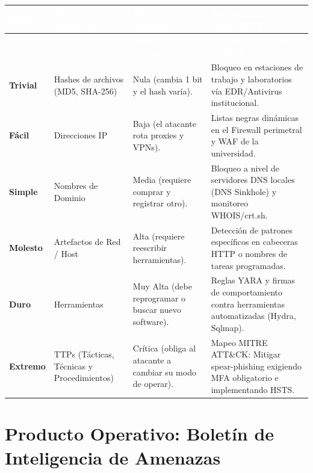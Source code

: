 \vspace{-0.5em}

\begingroup
\small
\begin{longtable}{>{\centering\arraybackslash}p{1.7cm} p{3.0cm} p{3.2cm} p{6.8cm}}
\toprule
\rowcolor{fg}
\textcolor{white}{Nivel} & \textcolor{white}{Tipo de Indicador} & \textcolor{white}{Dificultad Atacante} & \textcolor{white}{Aplicación Defensiva en la UNAP} \\
\midrule
\endfirsthead
\toprule
\rowcolor{fg}
\textcolor{white}{Nivel} & \textcolor{white}{Tipo de Indicador} & \textcolor{white}{Dificultad Atacante} & \textcolor{white}{Aplicación Defensiva en la UNAP} \\
\midrule
\endhead
\bottomrule
\endfoot
\textcolor{popHash!70!black}{\textbf{Trivial}} & Hashes de archivos (MD5, SHA-256) & Nula (cambia 1 bit y el hash varía). & Bloqueo en estaciones de trabajo y laboratorios vía EDR/Antivirus institucional. \\
\midrule
\textcolor{popIP!80!black}{\textbf{Fácil}} & Direcciones IP & Baja (el atacante rota proxies y VPNs). & Listas negras dinámicas en el Firewall perimetral y WAF de la universidad. \\
\midrule
\textcolor{popDomain!85!black}{\textbf{Simple}} & Nombres de Dominio & Media (requiere comprar y registrar otro). & Bloqueo a nivel de servidores DNS locales (DNS Sinkhole) y monitoreo WHOIS/crt.sh. \\
\midrule
\textcolor{popArtifact!85!black}{\textbf{Molesto}} & Artefactos de Red / Host & Alta (requiere reescribir herramientas). & Detección de patrones específicos en cabeceras HTTP o nombres de tareas programadas. \\
\midrule
\textcolor{popTool!85!black}{\textbf{Duro}} & Herramientas & Muy Alta (debe reprogramar o buscar nuevo software). & Reglas YARA y firmas de comportamiento contra herramientas automatizadas (Hydra, Sqlmap). \\
\midrule
\textcolor{popTTP!85!black}{\textbf{Extremo}} & TTPs (Tácticas, Técnicas y Procedimientos) & Crítica (obliga al atacante a cambiar su modo de operar). & Mapeo MITRE ATT\&CK: Mitigar spear-phishing exigiendo MFA obligatorio e implementando HSTS. \\
\bottomrule
\end{longtable}
\endgroup

\clearpage

\section{Producto Operativo: Boletín de Inteligencia de Amenazas}

